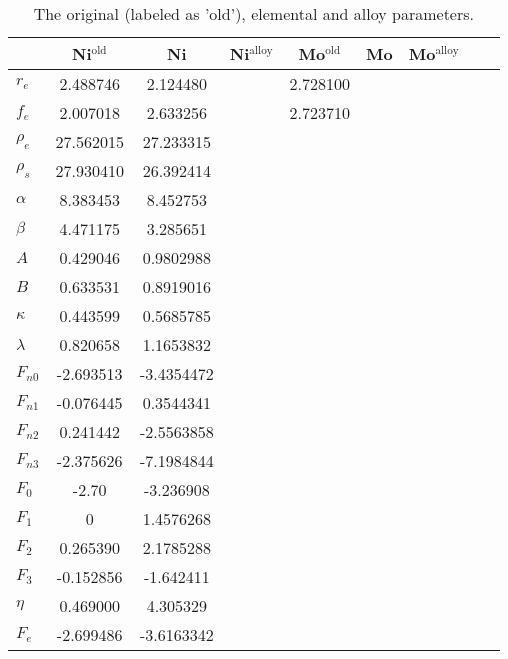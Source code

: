 \documentclass[prb,reprint]{revtex4-2}
\begin{document}
\begin{table*}[h]
\centering
\begin{tabular}{lcccccccc}
\hline
    & Ni$^{\mathrm{old}}$ & Ni & Ni$^{\mathrm{alloy}}$ 
    & Mo$^{\mathrm{old}}$ & Mo & Mo$^{\mathrm{alloy}}$ \\
\hline
$r_e$ & 2.488746 & 2.124480 & & 2.728100 & & \\
$f_e$ & 2.007018 & 2.633256 & & 2.723710 & & \\
$\rho_e$ & 27.562015 & 27.233315 & \\ 
$\rho_s$ & 27.930410 & 26.392414 &\\
$\alpha$ & 8.383453 & 8.452753 & \\
$\beta$ & 4.471175 & 3.285651 & \\
$A$ & 0.429046 & 0.9802988 & \\
$B$ & 0.633531 & 0.8919016 & \\
$\kappa$ & 0.443599 & 0.5685785 & \\
$\lambda$ & 0.820658 & 1.1653832 & \\
$F_{n0}$ & -2.693513 & -3.4354472 & \\
$F_{n1}$ & -0.076445 & 0.3544341 & \\
$F_{n2}$ & 0.241442 & -2.5563858 & \\
$F_{n3}$ & -2.375626 & -7.1984844 & \\
$F_{0}$ & -2.70 & -3.236908 & \\
$F_{1}$ & 0 & 1.4576268 & \\
$F_{2}$ & 0.265390 & 2.1785288 & \\
$F_{3}$ & -0.152856 & -1.642411 & \\
$\eta$ & 0.469000 & 4.305329 & \\
$F_e$ & -2.699486 & -3.6163342 & \\
\hline
\end{tabular}
\caption{\label{table:parameters} The original (labeled as 'old'), elemental and 
alloy parameters.}
\end{table*}
\end{document}
